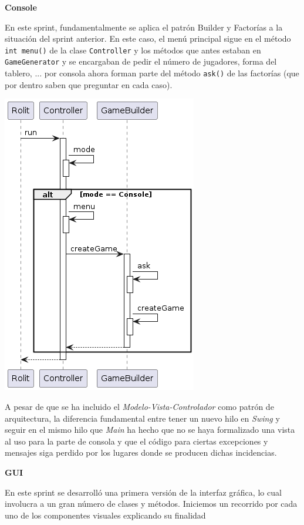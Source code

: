 \documentclass[../DocumentoOficial.tex]{subfiles}
\begin{document}
\begin{sprint}[4]
\textbf{Console}

En este sprint, fundamentalmente se aplica el patrón Builder y Factorías a la situación del sprint anterior. En este caso, el menú principal sigue en el método \texttt{int menu()} de la clase \texttt{Controller} y los métodos que antes estaban en \texttt{GameGenerator} y se encargaban de pedir el número de jugadores, forma del tablero, ... por consola ahora forman parte del método \texttt{ask()} de las factorías (que por dentro saben que preguntar en cada caso).
\begin{center}
\includegraphics[scale=0.55]{MenuPpal_sprint4_seq}
\end{center}
A pesar de que se ha incluido el \textit{Modelo-Vista-Controlador} como patrón de arquitectura, la diferencia fundamental entre tener un nuevo hilo en \textit{Swing} y seguir en el mismo hilo que \textit{Main} ha hecho que no se haya formalizado una vista al uso para la parte de consola y que el código para ciertas excepciones y mensajes siga perdido por los lugares donde se producen dichas incidencias.

\textbf{GUI}

En este sprint se desarrolló una primera versión de la interfaz gráfica, lo cual involucra a un gran número de clases y métodos. Iniciemos un recorrido por cada uno de los componentes visuales explicando su finalidad


\end{sprint}
\end{document}
